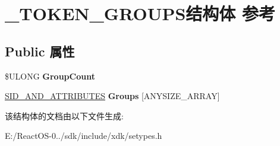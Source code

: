 \hypertarget{struct___t_o_k_e_n___g_r_o_u_p_s}{}\section{\+\_\+\+T\+O\+K\+E\+N\+\_\+\+G\+R\+O\+U\+P\+S结构体 参考}
\label{struct___t_o_k_e_n___g_r_o_u_p_s}
\subsection*{Public 属性}
\begin{DoxyCompactItemize}
\item 
\mbox{\label{struct___t_o_k_e_n___g_r_o_u_p_s_ac5ac7f7705555aa73cbe450f5ff60d37}} 
\$U\+L\+O\+NG {\bfseries Group\+Count}
\item 
\mbox{\label{struct___t_o_k_e_n___g_r_o_u_p_s_a5077939ecb718a7a557e9fe580f11523}} 
\hyperlink{struct___s_i_d___a_n_d___a_t_t_r_i_b_u_t_e_s}{S\+I\+D\+\_\+\+A\+N\+D\+\_\+\+A\+T\+T\+R\+I\+B\+U\+T\+ES} {\bfseries Groups} \mbox{[}A\+N\+Y\+S\+I\+Z\+E\+\_\+\+A\+R\+R\+AY\mbox{]}
\end{DoxyCompactItemize}


该结构体的文档由以下文件生成\+:\begin{DoxyCompactItemize}
\item 
E\+:/\+React\+O\+S-\/0../sdk/include/xdk/setypes.\+h\end{DoxyCompactItemize}

